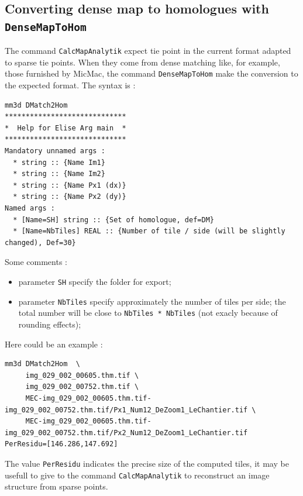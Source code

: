 
\subsection{Converting dense map to homologues with {\tt DenseMapToHom}}

The command {\tt CalcMapAnalytik} expect tie point in the current format adapted
to sparse tie points. When they come from dense matching like, for example,
those furnished by MicMac, the command {\tt DenseMapToHom} make the conversion
to the expected format. The syntax is : 


\begin{verbatim}
mm3d DMatch2Hom
*****************************
*  Help for Elise Arg main  *
*****************************
Mandatory unnamed args : 
  * string :: {Name Im1}
  * string :: {Name Im2}
  * string :: {Name Px1 (dx)}
  * string :: {Name Px2 (dy)}
Named args : 
  * [Name=SH] string :: {Set of homologue, def=DM}
  * [Name=NbTiles] REAL :: {Number of tile / side (will be slightly changed), Def=30}
\end{verbatim}

Some comments :

\begin{itemize}
   \item parameter {\tt SH} specify the folder  for export;
   \item parameter {\tt NbTiles} specify approximately the number of tiles per side;
         the total number will be close to {\tt NbTiles * NbTiles} (not exacly because of rounding effects);
\end{itemize}

Here could be an example :

\begin{verbatim}
mm3d DMatch2Hom  \
     img_029_002_00605.thm.tif \
     img_029_002_00752.thm.tif \
     MEC-img_029_002_00605.thm.tif-img_029_002_00752.thm.tif/Px1_Num12_DeZoom1_LeChantier.tif \
     MEC-img_029_002_00605.thm.tif-img_029_002_00752.thm.tif/Px2_Num12_DeZoom1_LeChantier.tif 
PerResidu=[146.286,147.692]
\end{verbatim}

The value {\tt PerResidu} indicates the precise size of the computed tiles,
it may be usefull to give to the command {\tt CalcMapAnalytik} to reconstruct
an image structure from sparse points.


